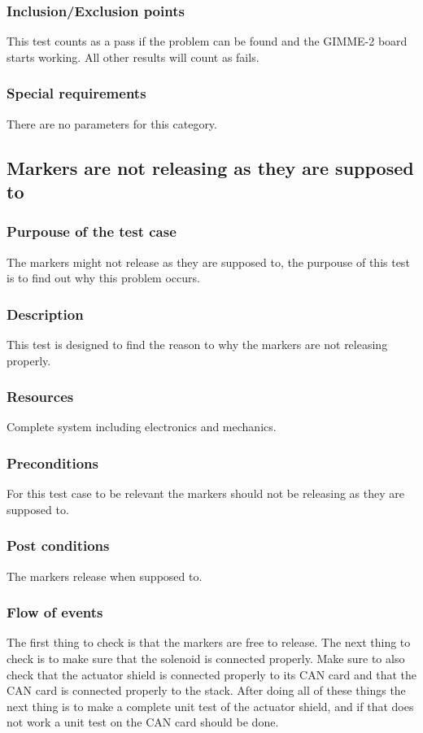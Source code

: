 \subsubsection*{Inclusion/Exclusion points}
This test counts as a pass if the problem can be found and the GIMME-2 board starts working. All other results will count as fails. 
\subsubsection*{Special requirements}
There are no parameters for this category. 

\subsection{Markers are not releasing as they are supposed to}
\subsubsection*{Purpouse of the test case}
The markers might not release as they are supposed to, the purpouse of this test is to find out why this problem occurs. 
\subsubsection*{Description}
This test is designed to find the reason to why the markers are not releasing properly. 
\subsubsection*{Resources}
Complete system including electronics and mechanics.  
\subsubsection*{Preconditions}
For this test case to be relevant the markers should not be releasing as they are supposed to. 
\subsubsection*{Post conditions}
The markers release when supposed to. 
\subsubsection*{Flow of events}
The first thing to check is that the markers are free to release. The next thing to check is to make sure that the solenoid is connected properly. Make sure to also check that the actuator shield is connected properly to its CAN card and that the CAN card is connected properly to the stack. After doing all of these things the next thing is to make a complete unit test of the actuator shield, and if that does not work a unit test on the CAN card should be done.

